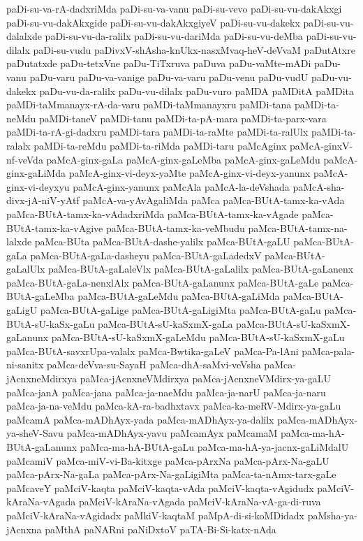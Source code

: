 {paDi-su-va-rA-dadxriMda
paDi-su-va-vanu
paDi-su-vevo
paDi-su-vu-dakAkxgi
paDi-su-vu-dakAkxgide
paDi-su-vu-dakAkxgiyeV
paDi-su-vu-dakekx
paDi-su-vu-dalalxde
paDi-su-vu-da-ralilx
paDi-su-vu-dariMda
paDi-su-vu-deMba
paDi-su-vu-dilalx
paDi-su-vudu
paDivxV-shAsha-knUkx-nasxMvaq-heV-deVvaM
paDutAtxre
paDutatxde
paDu-tetxVne
paDu-TiTxruva
paDuva
paDu-vaMte-mADi
paDu-vanu
paDu-varu
paDu-va-vanige
paDu-va-varu
paDu-venu
paDu-vudU
paDu-vu-dakekx
paDu-vu-da-ralilx
paDu-vu-dilalx
paDu-vuro
paMDA
paMDitA
paMDita
paMDi-taMmanayx-rA-da-varu
paMDi-taMmanayxru
paMDi-tana
paMDi-ta-neMdu
paMDi-taneV
paMDi-tanu
paMDi-ta-pA-mara
paMDi-ta-parx-vara
paMDi-ta-rA-gi-dadxru
paMDi-tara
paMDi-ta-raMte
paMDi-ta-ralUlx
paMDi-ta-ralalx
paMDi-ta-reMdu
paMDi-ta-riMda
paMDi-taru
paMcAginx
paMcA-ginxV-nf-veVda
paMcA-ginx-gaLa
paMcA-ginx-gaLeMba
paMcA-ginx-gaLeMdu
paMcA-ginx-gaLiMda
paMcA-ginx-vi-deyx-yaMte
paMcA-ginx-vi-deyx-yanunx
paMcA-ginx-vi-deyxyu
paMcA-ginx-yanunx
paMcAla
paMcA-la-deVshada
paMcA-sha-divx-jA-niV-yAtf
paMcA-va-yAvAgaliMda
paMca
paMca-BUtA-tamx-ka-vAda
paMca-BUtA-tamx-ka-vAdadxriMda
paMca-BUtA-tamx-ka-vAgade
paMca-BUtA-tamx-ka-vAgive
paMca-BUtA-tamx-ka-veMbudu
paMca-BUtA-tamx-na-lalxde
paMca-BUta
paMca-BUtA-dashe-yalilx
paMca-BUtA-gaLU
paMca-BUtA-gaLa
paMca-BUtA-gaLa-dasheyu
paMca-BUtA-gaLadedxV
paMca-BUtA-gaLalUlx
paMca-BUtA-gaLaleVlx
paMca-BUtA-gaLalilx
paMca-BUtA-gaLanenx
paMca-BUtA-gaLa-nenxlAlx
paMca-BUtA-gaLanunx
paMca-BUtA-gaLe
paMca-BUtA-gaLeMba
paMca-BUtA-gaLeMdu
paMca-BUtA-gaLiMda
paMca-BUtA-gaLigU
paMca-BUtA-gaLige
paMca-BUtA-gaLigiMta
paMca-BUtA-gaLu
paMca-BUtA-sU-kaSx-gaLu
paMca-BUtA-sU-kaSxmX-gaLa
paMca-BUtA-sU-kaSxmX-gaLanunx
paMca-BUtA-sU-kaSxmX-gaLeMdu
paMca-BUtA-sU-kaSxmX-gaLu
paMca-BUtA-savxrUpa-valalx
paMca-Bwtika-gaLeV
paMca-Pa-lAni
paMca-pala-ni-sanitx
paMca-deVva-su-SayaH
paMca-dhA-saMvi-veVsha
paMca-jAcnxneMdirxya
paMca-jAcnxneVMdirxya
paMca-jAcnxneVMdirx-ya-gaLU
paMca-janA
paMca-jana
paMca-ja-naeMdu
paMca-ja-narU
paMca-ja-naru
paMca-ja-na-veMdu
paMca-kA-ra-badhxtavx
paMca-ka-meRV-Mdirx-ya-gaLu
paMcamA
paMca-mADhAyx-yada
paMca-mADhAyx-ya-dalilx
paMca-mADhAyx-ya-sheV-Savu
paMca-mADhAyx-yavu
paMcamAyx
paMcamaM
paMca-ma-hA-BUtA-gaLanunx
paMca-ma-hA-BUtA-gaLu
paMca-ma-hA-ya-jacnx-gaLiMdalU
paMcamiV
paMca-miV-vi-Ba-kitxge
paMca-pArxNa
paMca-pArx-Na-gaLU
paMca-pArx-Na-gaLa
paMca-pArx-Na-gaLigiMta
paMca-ta-nAmx-tarx-gaLe
paMcaveY
paMciV-kaqta
paMciV-kaqta-vAda
paMciV-kaqta-vAgidudx
paMciV-kAraNa-vAgada
paMciV-kAraNa-vAgada
paMciV-kAraNa-vA-ga-di-ruva
paMciV-kAraNa-vAgidadx
paMkiV-kaqtaM
paMpA-di-si-koMDidadx
paMsha-ya-jAcnxna
paMthA
paNARni
paNiDxtoV
paTA-Bi-Si-katx-nAda
}
